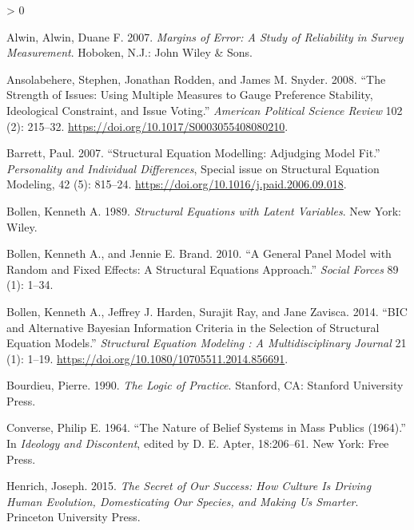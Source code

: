 \documentclass[
  11pt,
]{article}
\newlength{\cslhangindent}
\newenvironment{CSLReferences}[2] %
 {%
  \setlength{\parindent}{0pt}
  \ifodd #1 \everypar{\setlength{\hangindent}{\cslhangindent}}\ignorespaces\fi
  \ifnum #2 > 0
  \setlength{\parskip}{#2\baselineskip}
  \fi
 }%
 {}
\begin{document}
\hypertarget{refs}{}
\begin{CSLReferences}{1}{0}
\leavevmode\hypertarget{ref-alwin2007}{}%
Alwin, Alwin, Duane F. 2007. \emph{Margins of {Error}: {A Study} of {Reliability} in {Survey Measurement}}. {Hoboken, N.J.}: {John Wiley \& Sons}.

\leavevmode\hypertarget{ref-ansolabehere2008}{}%
Ansolabehere, Stephen, Jonathan Rodden, and James M. Snyder. 2008. {``The {Strength} of {Issues}: {Using Multiple Measures} to {Gauge Preference Stability}, {Ideological Constraint}, and {Issue Voting}.''} \emph{American Political Science Review} 102 (2): 215--32. \url{https://doi.org/10.1017/S0003055408080210}.

\leavevmode\hypertarget{ref-barrett2007}{}%
Barrett, Paul. 2007. {``Structural Equation Modelling: {Adjudging} Model Fit.''} \emph{Personality and Individual Differences}, Special issue on {Structural Equation Modeling}, 42 (5): 815--24. \url{https://doi.org/10.1016/j.paid.2006.09.018}.

\leavevmode\hypertarget{ref-bollen1989}{}%
Bollen, Kenneth A. 1989. \emph{Structural {Equations} with {Latent Variables}}. {New York}: {Wiley}.

\leavevmode\hypertarget{ref-bollen2010}{}%
Bollen, Kenneth A., and Jennie E. Brand. 2010. {``A {General Panel Model} with {Random} and {Fixed Effects}: {A Structural Equations Approach}.''} \emph{Social Forces} 89 (1): 1--34.

\leavevmode\hypertarget{ref-bollen2014}{}%
Bollen, Kenneth A., Jeffrey J. Harden, Surajit Ray, and Jane Zavisca. 2014. {``{BIC} and {Alternative Bayesian Information Criteria} in the {Selection} of {Structural Equation Models}.''} \emph{Structural Equation Modeling : A Multidisciplinary Journal} 21 (1): 1--19. \url{https://doi.org/10.1080/10705511.2014.856691}.

\leavevmode\hypertarget{ref-bourdieu1990}{}%
Bourdieu, Pierre. 1990. \emph{The {Logic} of {Practice}}. {Stanford, CA}: {Stanford University Press}.

\leavevmode\hypertarget{ref-converse1964}{}%
Converse, Philip E. 1964. {``The Nature of Belief Systems in Mass Publics (1964).''} In \emph{Ideology and Discontent}, edited by D. E. Apter, 18:206--61. {New York}: {Free Press}.

\leavevmode\hypertarget{ref-henrich2015}{}%
Henrich, Joseph. 2015. \emph{The {Secret} of {Our Success}: {How Culture Is Driving Human Evolution}, {Domesticating Our Species}, and {Making Us Smarter}}. {Princeton University Press}.


\end{CSLReferences}
\end{document}
